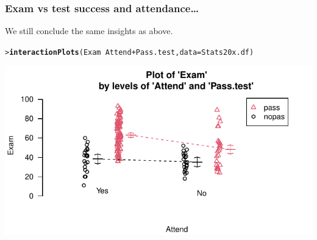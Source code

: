 \documentclass{beamer}\usepackage[]{graphicx}\usepackage[]{xcolor}
\makeatletter
\def\maxwidth{ %
  \ifdim\Gin@nat@width>\linewidth
    \linewidth
  \else
    \Gin@nat@width
  \fi
}
\newcommand{\hlopt}[1]{\textcolor[rgb]{0,0,0}{#1}}%
\newcommand{\hlstd}[1]{\textcolor[rgb]{0.345,0.345,0.345}{#1}}%
\newcommand{\hlkwc}[1]{\textcolor[rgb]{0.333,0.667,0.333}{#1}}%
\newcommand{\hlkwd}[1]{\textcolor[rgb]{0.737,0.353,0.396}{\textbf{#1}}}%
\newenvironment{kframe}{%
 \def\at@end@of@kframe{}%
 \ifinner\ifhmode%
  \def\at@end@of@kframe{\end{minipage}}%
  \begin{minipage}{\columnwidth}%
 \fi\fi%
 \def\FrameCommand##1{\hskip\@totalleftmargin \hskip-\fboxsep
 \colorbox{shadecolor}{##1}\hskip-\fboxsep
     \hskip-\linewidth \hskip-\@totalleftmargin \hskip\columnwidth}%
 \MakeFramed {\advance\hsize-\width
   \@totalleftmargin\z@ \linewidth\hsize
   \@setminipage}}%
 {\par\unskip\endMakeFramed%
 \at@end@of@kframe}
\newenvironment{knitrout}{}{} %
\makeatother
\begin{document}
\begin{frame}[fragile]
\frametitle{Exam vs test success and attendance\ldots}
We still conclude the same insights as above. \medskip

\begin{knitrout}\scriptsize
{}\color{fgcolor}\begin{kframe}
\begin{alltt}
\hlstd{> }\hlkwd{interactionPlots}\hlstd{(Exam} \hlopt{~} \hlstd{Attend} \hlopt{+} \hlstd{Pass.test,} \hlkwc{data} \hlstd{= Stats20x.df)}
\end{alltt}
\end{kframe}
\end{knitrout}

\begin{knitrout}\scriptsize
{}\color{fgcolor}
\includegraphics[width=\maxwidth]{figure/RC-H12-007-1} 
\end{knitrout}

\end{frame}



\end{document}
